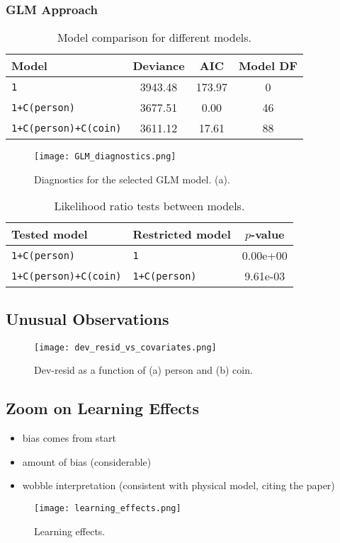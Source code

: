 \documentclass[a4paper, 12pt,oneside]{article}
\begin{document}
			\subsubsection{GLM Approach}
			\lipsum[1]
			\begin{table}[htb]
				\centering
				\caption{Model comparison for different models.}
				\label{tab:model-comparison}
				\begin{tabular}{lccc}
				\toprule
				Model & Deviance & AIC & Model DF \\
				\midrule
				\texttt{1} & 3943.48 & 173.97 & 0 \\
				\texttt{1+C(person)} & 3677.51 & 0.00 & 46 \\
				\texttt{1+C(person)+C(coin)} & 3611.12 & 17.61 & 88 \\
				\bottomrule
				\end{tabular}
			\end{table}
			\lipsum[1]
			\begin{figure}[htb]
				\centering
				\texttt{[image: GLM\_diagnostics.png]}
				\caption{Diagnostics for the selected GLM model. (a).}
				\label{fig:glm-diagnostic}
			\end{figure}
			\lipsum[1]
			\begin{table}[htb]
				\centering
				\caption{Likelihood ratio tests between models.}
				\label{tab:llr-comparison}
				\begin{tabular}{llc}
				\toprule
				Tested model & Restricted model & $p$-value \\
				\midrule
				\texttt{1+C(person)} & \texttt{1} & 0.00e+00 \\
				\texttt{1+C(person)+C(coin)} & \texttt{1+C(person)} & 9.61e-03 \\
				\bottomrule
				\end{tabular}
			\end{table}
		\subsection{Unusual Observations}
		\begin{figure}[htb]
			\centering
			\texttt{[image: dev\_resid\_vs\_covariates.png]}
			\caption{Dev-resid as a function of (a) person and (b) coin.}
			\label{fig:dev-resid-vs-covariates}
		\end{figure}

		\subsection{Zoom on Learning Effects}
		\begin{itemize}
			\item bias comes from start
			\item amount of bias (considerable)
			\item wobble interpretation (consistent with physical model, citing the paper)
		\end{itemize}
		\lipsum[1]
		\begin{figure}[htb]
			\centering
			\texttt{[image: learning\_effects.png]}
			\caption{Learning effects.}
			\label{fig:learning-effects}
		\end{figure}
\end{document}
